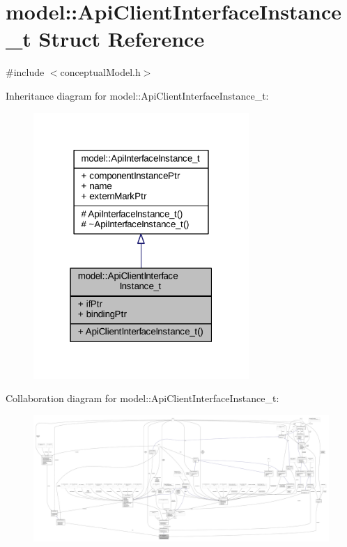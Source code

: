 \hypertarget{structmodel_1_1_api_client_interface_instance__t}{}\section{model\+:\+:Api\+Client\+Interface\+Instance\+\_\+t Struct Reference}
\label{structmodel_1_1_api_client_interface_instance__t}


{\ttfamily \#include $<$conceptual\+Model.\+h$>$}



Inheritance diagram for model\+:\+:Api\+Client\+Interface\+Instance\+\_\+t\+:
\nopagebreak
\begin{figure}[H]
\begin{center}
\leavevmode
\includegraphics[width=232pt]{structmodel_1_1_api_client_interface_instance__t__inherit__graph}
\end{center}
\end{figure}


Collaboration diagram for model\+:\+:Api\+Client\+Interface\+Instance\+\_\+t\+:
\nopagebreak
\begin{figure}[H]
\begin{center}
\leavevmode
\includegraphics[width=350pt]{structmodel_1_1_api_client_interface_instance__t__coll__graph}
\end{center}
\end{figure}
